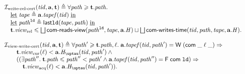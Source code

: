 \[\begin{array}{l}
\invViewRelCERT(\tId, \aT, \tT) \triangleq \forall \cpath \ge \tT.\cpath. \\
  \quad \textLet \tape \triangleq \aT.\tapef(\tId) \; \textIn \\
  \quad \textLet \cpath^{\LD} \triangleq \lastLD(\tape, \cpath) \; \textIn \\
  \quad \tT.\Rrel \le
  \bigsqcup \readsCommittedR(\cpath^{\LD}, \tape, \aT.\hmap) \sqcup \bigsqcup \opstau(\tId, \cpath, \tape, \aT.\hmap).\\
\\
\invViewWriteCERT(\tId, \aT, \tT) \triangleq
  \forall \cpath' \ge \tT.\cpath, \loc. \;
    \aT.\tapef(\tId, \cpath') = \tapeWrite{(\tapeWriteCommitted{\_}{\loc}{\_})} \Rightarrow \\
\quad \quad \tT.\Rcur(\loc) < \aT.\tmap(\tId, \cpath') \land {} \\
\quad \quad ((\exists \cpath''. \; \tT.\cpath \le \cpath'' < \cpath' \land 
             \aT.\tapef(\tId, \cpath'') = \tapeFence{\Committed}{\LD}) \Rightarrow \\
\quad \quad \quad \tT.\Racq(\loc) < \aT.\tmap(\tId, \cpath')).\\
\end{array}\]

